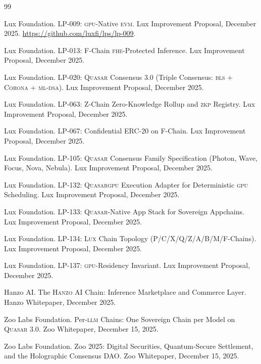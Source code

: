 \documentclass[11pt,letterpaper]{article}
\newcommand{\Lux}{\textsc{Lux}}
\newcommand{\Hanzo}{\textsc{Hanzo}}
\newcommand{\Quasar}{\textsc{Quasar}}
\newcommand{\QuasarGPU}{\textsc{Quasar}\textsc{gpu}}
\newcommand{\LLM}{\textsc{llm}}
\newcommand{\GPU}{\textsc{gpu}}
\newcommand{\FHE}{\textsc{fhe}}
\newcommand{\ZKP}{\textsc{zkp}}
\newcommand{\BLS}{\textsc{bls}}
\newcommand{\MLDSA}{\textsc{ml-dsa}}
\newcommand{\Corona}{\textsc{Corona}}
\begin{document}
\begin{thebibliography}{99}

Lux Foundation.
\newblock LP-009: \GPU{}-Native \textsc{evm}.
\newblock Lux Improvement Proposal, December 2025.
\newblock \url{https://github.com/luxfi/lps/lp-009}.

Lux Foundation.
\newblock LP-013: F-Chain \FHE{}-Protected Inference.
\newblock Lux Improvement Proposal, December 2025.

Lux Foundation.
\newblock LP-020: \Quasar{} Consensus 3.0 (Triple Consensus: \BLS{} + \Corona{} + \MLDSA{}).
\newblock Lux Improvement Proposal, December 2025.

Lux Foundation.
\newblock LP-063: Z-Chain Zero-Knowledge Rollup and \ZKP{} Registry.
\newblock Lux Improvement Proposal, December 2025.

Lux Foundation.
\newblock LP-067: Confidential ERC-20 on F-Chain.
\newblock Lux Improvement Proposal, December 2025.

Lux Foundation.
\newblock LP-105: \Quasar{} Consensus Family Specification (Photon, Wave, Focus, Nova, Nebula).
\newblock Lux Improvement Proposal, December 2025.

Lux Foundation.
\newblock LP-132: \QuasarGPU{} Execution Adapter for Deterministic \GPU{} Scheduling.
\newblock Lux Improvement Proposal, December 2025.

Lux Foundation.
\newblock LP-133: \Quasar{}-Native App Stack for Sovereign Appchains.
\newblock Lux Improvement Proposal, December 2025.

Lux Foundation.
\newblock LP-134: \Lux{} Chain Topology (P/C/X/Q/Z/A/B/M/F-Chains).
\newblock Lux Improvement Proposal, December 2025.

Lux Foundation.
\newblock LP-137: \GPU{}-Residency Invariant.
\newblock Lux Improvement Proposal, December 2025.

Hanzo AI.
\newblock The \Hanzo{} AI Chain: Inference Marketplace and Commerce Layer.
\newblock Hanzo Whitepaper, December 2025.

Zoo Labs Foundation.
\newblock Per-\LLM{} Chains: One Sovereign Chain per Model on \Quasar{} 3.0.
\newblock Zoo Whitepaper, December 15, 2025.

Zoo Labs Foundation.
\newblock Zoo 2025: Digital Securities, Quantum-Secure Settlement, and the Holographic Consensus DAO.
\newblock Zoo Whitepaper, December 15, 2025.


\end{thebibliography}
\end{document}
